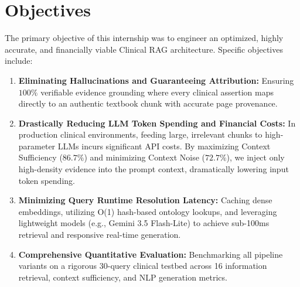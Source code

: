 \documentclass[11pt,a4paper]{article}
\begin{document}
\section{Objectives}
The primary objective of this internship was to engineer an optimized, highly accurate, and financially viable Clinical RAG architecture. Specific objectives include:
\begin{enumerate}[leftmargin=1.8em, itemsep=0.2em]
    \item \textbf{Eliminating Hallucinations and Guaranteeing Attribution:} Ensuring $100\%$ verifiable evidence grounding where every clinical assertion maps directly to an authentic textbook chunk with accurate page provenance.
    \item \textbf{Drastically Reducing LLM Token Spending and Financial Costs:} In production clinical environments, feeding large, irrelevant chunks to high-parameter LLMs incurs significant API costs. By maximizing Context Sufficiency ($86.7\%$) and minimizing Context Noise ($72.7\%$), we inject only high-density evidence into the prompt context, dramatically lowering input token spending.
    \item \textbf{Minimizing Query Runtime Resolution Latency:} Caching dense embeddings, utilizing O(1) hash-based ontology lookups, and leveraging lightweight models (e.g., Gemini 3.5 Flash-Lite) to achieve sub-100ms retrieval and responsive real-time generation.
    \item \textbf{Comprehensive Quantitative Evaluation:} Benchmarking all pipeline variants on a rigorous 30-query clinical testbed across 16 information retrieval, context sufficiency, and NLP generation metrics.
\end{enumerate}

\end{document}
